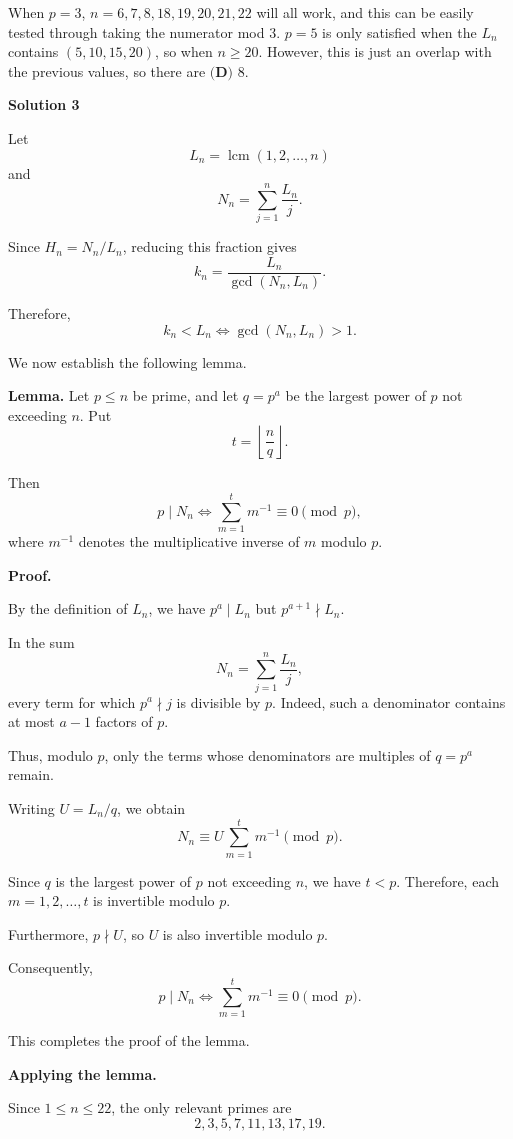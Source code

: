 \begin{enumerate}
 When $p=3$, $n=6,7,8,18,19,20,21,22$ will all work, and this can be easily tested through taking the numerator mod $3$. $p=5$ is only satisfied when the $L_n$ contains $(5,10,15,20)$, so when $n\ge 20$. However, this is just an overlap with the previous values, so there are $\boxed{\textbf{(D) }8}$.

 


 



\textbf{Solution 3}

Let
 \[L_n=\operatorname{lcm}(1,2,\ldots,n)\]and
 \[N_n=\sum_{j=1}^{n}\frac{L_n}{j}.\]

 Since $H_n=N_n/L_n$, reducing this fraction gives
 \[k_n=\frac{L_n}{\gcd(N_n,L_n)}.\]

 Therefore,
 \[k_n<L_n\iff\gcd(N_n,L_n)>1.\]

 We now establish the following lemma.

 \textbf{Lemma.} Let $p\le n$ be prime, and let $q=p^a$ be the largest power of $p$ not exceeding $n$. Put
 \[t=\left\lfloor\frac nq\right\rfloor.\]

 Then
 \[p\mid N_n\iff\sum_{m=1}^{t}m^{-1}\equiv0\pmod p,\]where $m^{-1}$ denotes the multiplicative inverse of $m$ modulo $p$.

 \textbf{Proof.}

 By the definition of $L_n$, we have $p^a\mid L_n$ but $p^{a+1}\nmid L_n$.

 In the sum
 \[N_n=\sum_{j=1}^{n}\frac{L_n}{j},\]every term for which $p^a\nmid j$ is divisible by $p$. Indeed, such a denominator contains at most $a-1$ factors of $p$.

 Thus, modulo $p$, only the terms whose denominators are multiples of $q=p^a$ remain.

 Writing $U=L_n/q$, we obtain
 \[N_n\equiv U\sum_{m=1}^{t}m^{-1}\pmod p.\]

 Since $q$ is the largest power of $p$ not exceeding $n$, we have $t<p$. Therefore, each $m=1,2,\ldots,t$ is invertible modulo $p$.

 Furthermore, $p\nmid U$, so $U$ is also invertible modulo $p$.

 Consequently,
 \[\boxed{p\mid N_n\iff\sum_{m=1}^{t}m^{-1}\equiv0\pmod p}.\]

 This completes the proof of the lemma.

 \textbf{Applying the lemma.}

 Since $1\le n\le22$, the only relevant primes are
 \[2,3,5,7,11,13,17,19.\]


\end{enumerate}
